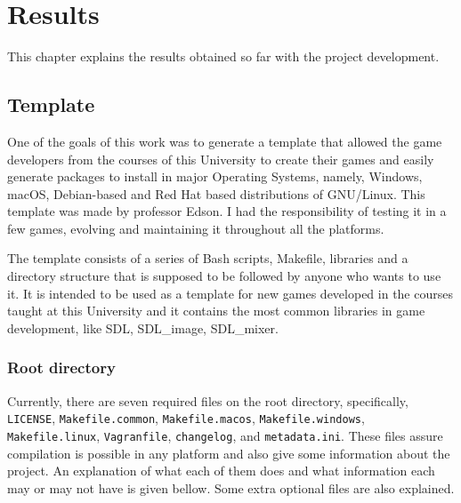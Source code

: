\chapter[Results]{Results}
\label{sec:results}

This chapter explains the results obtained so far with the project development.


\section{Template}
\label{sec:template}

One of the goals of this work was to generate a template that allowed the game developers from the courses of this University to create their games and easily generate packages to install in major Operating Systems, namely, Windows, macOS, Debian-based and Red Hat based distributions of GNU/Linux. This template was made by professor Edson.  I had the responsibility of testing it in a few games, evolving and maintaining it throughout all the platforms.

The template consists of a series of Bash scripts, Makefile, libraries and a directory structure that is supposed to be followed by anyone who wants to use it. It is intended to be used as a template for new games developed in the courses taught at this University and it contains the most common libraries in game development, like SDL, SDL\_image, SDL\_mixer.

\subsection{Root directory}
\label{sec:root_directory}

Currently, there are seven required files on the root directory, specifically, \texttt{LICENSE}, \texttt{Makefile.common}, \texttt{Makefile.macos}, \texttt{Makefile.windows}, \texttt{Makefile.linux}, \texttt{Vagranfile}, \texttt{changelog}, and \texttt{metadata.ini}. These files assure compilation is possible in any platform and also give some information about the project. An explanation of what each of them does and what information each may or may not have is given bellow. Some extra optional files are also explained.

